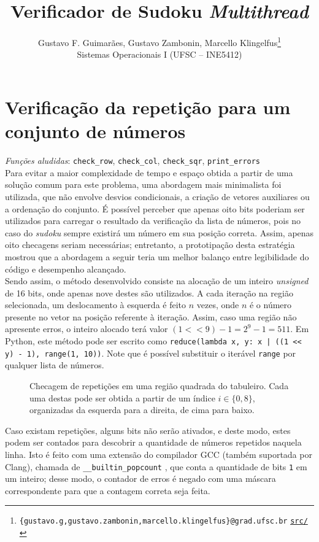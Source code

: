 \documentclass[12pt]{article}
\title{\textbf{Verificador de Sudoku \emph{Multithread}}}
\author{
  Gustavo F. Guimarães, Gustavo Zambonin, Marcello Klingelfus\thanks{
    \texttt{\{gustavo.g,gustavo.zambonin,marcello.klingelfus\}@grad.ufsc.br}
    \hfill \texttt{\href{https://github.com/zambonin/ufsc-ine5412}{src/}}
  } \\
  \small{Sistemas Operacionais I (UFSC -- INE5412)}
}
\date{}
\begin{document}
\maketitle

\section{Verificação da repetição para um conjunto de números}

\emph{Funções aludidas}: \texttt{check\_row}, \texttt{check\_col},
\texttt{check\_sqr}, \texttt{print\_errors} \\

Para evitar a maior complexidade de tempo e espaço obtida a partir de uma
solução comum para este problema, uma abordagem mais minimalista foi utilizada,
que não envolve desvios condicionais, a criação de vetores auxiliares ou a
ordenação do conjunto. É possível perceber que apenas oito bits poderiam ser
utilizados para carregar o resultado da verificação da lista de números, pois
no caso do \emph{sudoku} sempre existirá um número em sua posição correta.
Assim, apenas oito checagens seriam necessárias; entretanto, a prototipação
desta estratégia mostrou que a abordagem a seguir teria um melhor balanço entre
legibilidade do código e desempenho alcançado. \\

Sendo assim, o método desenvolvido consiste na alocação de um inteiro
\emph{unsigned} de 16 bits, onde apenas nove destes são utilizados. A cada
iteração na região selecionada, um deslocamento à esquerda é feito $n$ vezes,
onde $n$ é o número presente no vetor na posição referente à iteração. Assim,
caso uma região não apresente erros, o inteiro alocado terá valor
$(1 << 9) - 1 = 2^9 - 1 = 511$. Em Python, este método pode ser escrito como
\verb!reduce(lambda x, y: x | ((1 << y) - 1), range(1, 10))!.
Note que é possível substituir o iterável \texttt{range} por qualquer lista de
números.

\begin{figure}[htbp]
  
  \caption{Checagem de repetições em uma região quadrada do tabuleiro. Cada
    uma destas pode ser obtida a partir de um índice $i \in \{0, 8\}$,
    organizadas da esquerda para a direita, de cima para baixo.}
\end{figure}

Caso existam repetições, alguns bits não serão ativados, e deste modo, estes
podem ser contados para descobrir a quantidade de números repetidos naquela
linha. Isto é feito com uma extensão do compilador GCC (também suportada por
Clang), chamada de \texttt{\_\_builtin\_popcount} \cite{gcc}, que conta a
quantidade de bits \texttt{1} em um inteiro; desse modo, o contador de erros é
negado com uma máscara correspondente para que a contagem correta seja feita.
\end{document}
